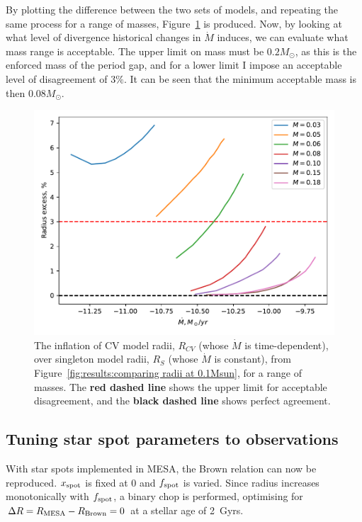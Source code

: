 By plotting the difference between the two sets of models, and repeating the same process for a range of masses, Figure~\ref{fig:results:comparing radii over a range of masses} is produced. Now, by looking at what level of divergence historical changes in $\dot M$ induces, we can evaluate what mass range is acceptable. The upper limit on mass must be $0.2 M_\odot$, as this is the enforced mass of the period gap, and for a lower limit I impose an acceptable level of disagreement of $3\%$. It can be seen that the minimum acceptable mass is then $0.08 M_\odot$.
\begin{figure}
    \centering
    \includegraphics[width=\textwidth]{figures/modelling/compare_multiple_mass_with_CV_K11_fig1a.pdf}
    \caption{The inflation of CV model radii, $R_{CV}$ (whose $\dot M$ is time-dependent), over singleton model radii, $R_S$ (whose $\dot M$ is constant), from Figure~\ref{fig:results:comparing radii at 0.1Msun}, for a range of masses. The {\bf red dashed line} shows the upper limit for acceptable disagreement, and the {\bf black dashed line} shows perfect agreement.}
    \label{fig:results:comparing radii over a range of masses}
\end{figure}



\subsection{Tuning star spot parameters to observations}
\label{sect:modelling:tuning star spots to observations}
With star spots implemented in MESA, the Brown relation can now be reproduced.
$x_{\rm spot}$ is fixed at 0 and $f_{\rm spot}$ is varied.
Since radius increases monotonically with $f_{\rm spot}$, a binary chop is performed, optimising for $\Delta R = R_{\rm MESA} - R_{\rm Brown} = 0$ at a stellar age of 2~Gyrs.

